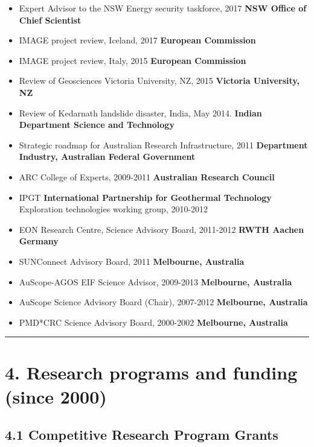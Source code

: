 \documentclass[
]{article}
\providecommand{\tightlist}{%
  \setlength{\itemsep}{0pt}\setlength{\parskip}{0pt}}
\begin{document}
\begin{itemize}
\tightlist
\item
  Expert Advisor to the NSW Energy security taskforce, 2017 \textbf{NSW
  Office of Chief Scientist}
\item
  IMAGE project review, Iceland, 2017 \textbf{European Commission}
\item
  IMAGE project review, Italy, 2015 \textbf{European Commission}
\item
  Review of Geosciences Victoria University, NZ, 2015 \textbf{Victoria
  University, NZ}
\item
  Review of Kedarnath landslide disaster, India, May 2014.
  \textbf{Indian Department Science and Technology}
\item
  Strategic roadmap for Australian Research Infrastructure, 2011
  \textbf{Department Industry, Australian Federal Government}
\item
  ARC College of Experts, 2009-2011 \textbf{Australian Research Council}
\item
  IPGT \textbf{International Partnership for Geothermal Technology}
  Exploration technologies working group, 2010-2012
\item
  EON Research Centre, Science Advisory Board, 2011-2012 \textbf{RWTH
  Aachen Germany}
\item
  SUNConnect Advisory Board, 2011 \textbf{Melbourne, Australia}
\item
  AuScope-AGOS EIF Science Advisor, 2009-2013 \textbf{Melbourne,
  Australia}
\item
  AuScope Science Advisory Board (Chair), 2007-2012 \textbf{Melbourne,
  Australia}
\item
  PMD*CRC Science Advisory Board, 2000-2002 \textbf{Melbourne,
  Australia}
\end{itemize}

\begin{center}\rule{0.5\linewidth}{0.5pt}\end{center}

\hypertarget{research-programs-and-funding-since-2000}{%
\section{4. Research programs and funding (since
2000)}\label{research-programs-and-funding-since-2000}}

\hypertarget{competitive-research-program-grants}{%
\subsection{4.1 Competitive Research Program
Grants}\label{competitive-research-program-grants}}
\end{document}
